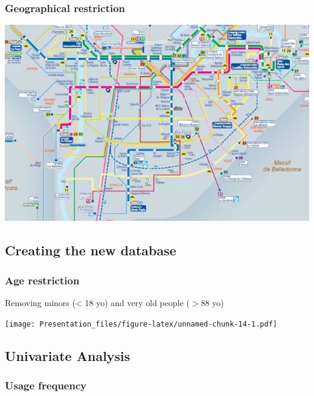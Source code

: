 \documentclass[
]{article}
\begin{document}
\hypertarget{geographical-restriction}{%
\subsubsection{Geographical
restriction}\label{geographical-restriction}}

\includegraphics{reseau tag.jpg}

\hypertarget{creating-the-new-database-1}{%
\subsection{Creating the new
database}\label{creating-the-new-database-1}}

\hypertarget{age-restriction}{%
\subsubsection{Age restriction}\label{age-restriction}}

\newline

Removing minors (\textless{} 18 yo) and very old people (\(> 88\) yo)

\texttt{[image: Presentation\_files/figure-latex/unnamed-chunk-14-1.pdf]}

\hypertarget{univariate-analysis}{%
\subsection{Univariate Analysis}\label{univariate-analysis}}

\hypertarget{usage-frequency}{%
\subsubsection{Usage frequency}\label{usage-frequency}}
\end{document}
